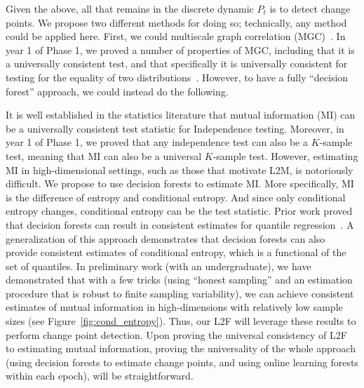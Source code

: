 \documentclass{article}
\begin{document}
Given the above, all that remains in the discrete dynamic $P_t$ is to detect change points. We propose two different methods for doing so; technically, any method could be applied here. First, we could multiscale graph correlation (MGC)~\cite{mgc1, mgc2}.  In year 1 of Phase 1, we proved a number of properties of MGC, including that it is a universally consistent test, and that specifically it is universally consistent for testing for the equality of two distributions~\cite{exact}.  However, to have a fully ``decision forest'' approach, we could instead do the following. 

It is well established in the statistics literature that mutual information (MI) can be a universally consistent test statistic for Independence testing.  Moreover, in year 1 of Phase 1, we proved that any independence test can also be a $K$-sample test, meaning that MI can also be a universal $K$-sample test. However, estimating MI in high-dimensional settings, such as those that motivate L2M, is notoriously difficult.  We propose to use decision forests to estimate MI.  More specifically,  MI is the difference of entropy and conditional entropy.  And since only conditional entropy changes, conditional entropy can be the test statistic.  Prior work proved that decision forests can result in consistent estimates for quantile regression~\cite{Meinhasser2006}.  A generalization of this approach demonstrates that decision forests can also provide consistent estimates of conditional entropy, which is a functional of the set of quantiles.  In preliminary work (with an undergraduate), we have demonstrated that with a few tricks (using ``honest sampling'' and an estimation procedure that is robust to finite sampling variability), we can achieve consistent estimates of mutual information in high-dimensions with relatively low sample sizes (see Figure~\ref{fig:cond_entropy}). Thus, our L2F will leverage these results to perform change point detection. Upon proving the universal consistency of L2F to estimating mutual information, proving the universality of the whole approach (using decision forests to estimate change points, and using online learning forests within each epoch), will be straightforward. 
\end{document}
